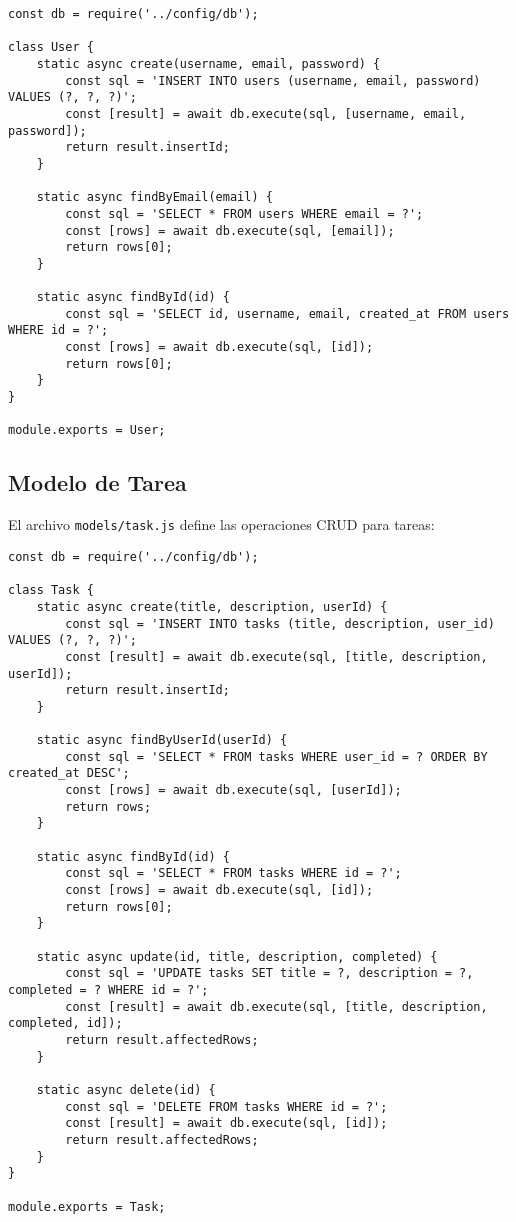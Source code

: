 \documentclass[12pt,a4paper]{article}
\begin{document}
\begin{lstlisting}
const db = require('../config/db');

class User {
    static async create(username, email, password) {
        const sql = 'INSERT INTO users (username, email, password) VALUES (?, ?, ?)';
        const [result] = await db.execute(sql, [username, email, password]);
        return result.insertId;
    }

    static async findByEmail(email) {
        const sql = 'SELECT * FROM users WHERE email = ?';
        const [rows] = await db.execute(sql, [email]);
        return rows[0];
    }

    static async findById(id) {
        const sql = 'SELECT id, username, email, created_at FROM users WHERE id = ?';
        const [rows] = await db.execute(sql, [id]);
        return rows[0];
    }
}

module.exports = User;
\end{lstlisting}

\subsection{Modelo de Tarea}

El archivo \texttt{models/task.js} define las operaciones CRUD para tareas:

\begin{lstlisting}
const db = require('../config/db');

class Task {
    static async create(title, description, userId) {
        const sql = 'INSERT INTO tasks (title, description, user_id) VALUES (?, ?, ?)';
        const [result] = await db.execute(sql, [title, description, userId]);
        return result.insertId;
    }

    static async findByUserId(userId) {
        const sql = 'SELECT * FROM tasks WHERE user_id = ? ORDER BY created_at DESC';
        const [rows] = await db.execute(sql, [userId]);
        return rows;
    }

    static async findById(id) {
        const sql = 'SELECT * FROM tasks WHERE id = ?';
        const [rows] = await db.execute(sql, [id]);
        return rows[0];
    }
    
    static async update(id, title, description, completed) {
        const sql = 'UPDATE tasks SET title = ?, description = ?, completed = ? WHERE id = ?';
        const [result] = await db.execute(sql, [title, description, completed, id]);
        return result.affectedRows;
    }

    static async delete(id) {
        const sql = 'DELETE FROM tasks WHERE id = ?';
        const [result] = await db.execute(sql, [id]);
        return result.affectedRows;
    }
}

module.exports = Task;
\end{lstlisting}
\end{document}
